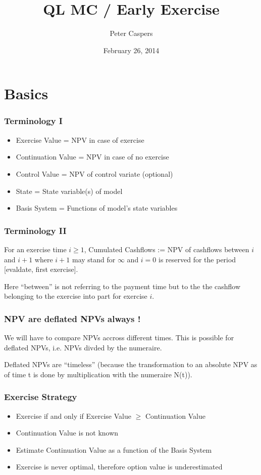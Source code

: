 \documentclass{beamer}
\begin{document}
\title{QL MC / Early Exercise}  
\author{Peter Caspers}
\date{February 26, 2014} 

\frame{\titlepage} 

\section{Basics}

\begin{frame}
\frametitle{Terminology I}
\begin{itemize}
\item Exercise Value = NPV in case of exercise
\item Continuation Value = NPV in case of no exercise
\item Control Value = NPV of control variate (optional)
\item State = State variable(s) of model
\item Basis System = Functions of model's state variables
\end{itemize}
\end{frame}

\begin{frame}
\frametitle{Terminology II}
For an exercise time $i\geq 1$, Cumulated Cashflows := NPV of cashflows between $i$ and $i+1$
where $i+1$ may stand for $\infty$ and $i=0$ is reserved for the period
[evaldate, first exercise]. 

Here ``between'' is not referring to the payment
time but to the the cashflow belonging to the exercise into part for 
exercise $i$.
\end{frame}

\begin{frame}
\frametitle{NPV are deflated NPVs always !}
We will have to compare NPVs accross different times. This is possible
for deflated NPVs, i.e. NPVs divded by the numeraire. 

Deflated NPVs are ``timeless'' (because the transformation to an absolute NPV as
of time t is done by multiplication with the numeraire N(t)).
\end{frame}

\begin{frame}
\frametitle{Exercise Strategy}
\begin{itemize}
\item Exercise if and only if Exercise Value $\geq$ Continuation Value
\item Continuation Value is not known
\item Estimate Continuation Value as a function of the Basis System
\item Exercise is never optimal, therefore option value is underestimated
\end{itemize}
\end{frame}
\end{document}
